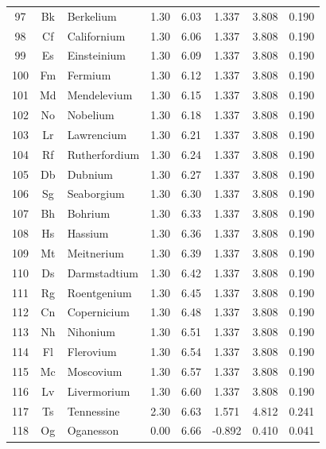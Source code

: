 \documentclass[12pt,a4paper]{article}
\theoremstyle{remark}
\begin{document}
\begin{longtable}{|c|c|p{2.5cm}|c|c|c|c|c|}
		97 & Bk & Berkelium & 1.30 & 6.03 & 1.337 & 3.808 & 0.190 \\
		98 & Cf & Californium & 1.30 & 6.06 & 1.337 & 3.808 & 0.190 \\
		99 & Es & Einsteinium & 1.30 & 6.09 & 1.337 & 3.808 & 0.190 \\
		100 & Fm & Fermium & 1.30 & 6.12 & 1.337 & 3.808 & 0.190 \\
		101 & Md & Mendelevium & 1.30 & 6.15 & 1.337 & 3.808 & 0.190 \\
		102 & No & Nobelium & 1.30 & 6.18 & 1.337 & 3.808 & 0.190 \\
		103 & Lr & Lawrencium & 1.30 & 6.21 & 1.337 & 3.808 & 0.190 \\
		104 & Rf & Rutherfordium & 1.30 & 6.24 & 1.337 & 3.808 & 0.190 \\
		105 & Db & Dubnium & 1.30 & 6.27 & 1.337 & 3.808 & 0.190 \\
		106 & Sg & Seaborgium & 1.30 & 6.30 & 1.337 & 3.808 & 0.190 \\
		107 & Bh & Bohrium & 1.30 & 6.33 & 1.337 & 3.808 & 0.190 \\
		108 & Hs & Hassium & 1.30 & 6.36 & 1.337 & 3.808 & 0.190 \\
		109 & Mt & Meitnerium & 1.30 & 6.39 & 1.337 & 3.808 & 0.190 \\
		110 & Ds & Darmstadtium & 1.30 & 6.42 & 1.337 & 3.808 & 0.190 \\
		111 & Rg & Roentgenium & 1.30 & 6.45 & 1.337 & 3.808 & 0.190 \\
		112 & Cn & Copernicium & 1.30 & 6.48 & 1.337 & 3.808 & 0.190 \\
		113 & Nh & Nihonium & 1.30 & 6.51 & 1.337 & 3.808 & 0.190 \\
		114 & Fl & Flerovium & 1.30 & 6.54 & 1.337 & 3.808 & 0.190 \\
		115 & Mc & Moscovium & 1.30 & 6.57 & 1.337 & 3.808 & 0.190 \\
		116 & Lv & Livermorium & 1.30 & 6.60 & 1.337 & 3.808 & 0.190 \\
		117 & Ts & Tennessine & 2.30 & 6.63 & 1.571 & 4.812 & 0.241 \\
		118 & Og & Oganesson & 0.00 & 6.66 & -0.892 & 0.410 & 0.041 \\
		\hline
	\end{longtable}
	
\end{document}
